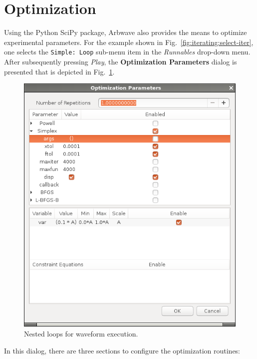 \section{Optimization}
Using the Python SciPy package, Arbwave also provides the means to optimize
experimental parameters.  For the example shown in
Fig.~\ref{fig:iterating:select-iter}, one selects the \texttt{Simple: Loop} sub-menu
item in the \textit{Runnables} drop-down menu.  After subsequently pressing
\textit{Play}, the \textbf{Optimization Parameters} dialog is presented that is
depicted in Fig.~\ref{fig:iterating:optim}.
%
\begin{figure}[ht!]
  \centerline{\includegraphics[width=.45\textwidth]{figures/optim}}
  \caption{
    Nested loops for waveform execution.
  }
  \label{fig:iterating:optim}
\end{figure}
%
In this dialog, there are three sections to configure the optimization routines:
